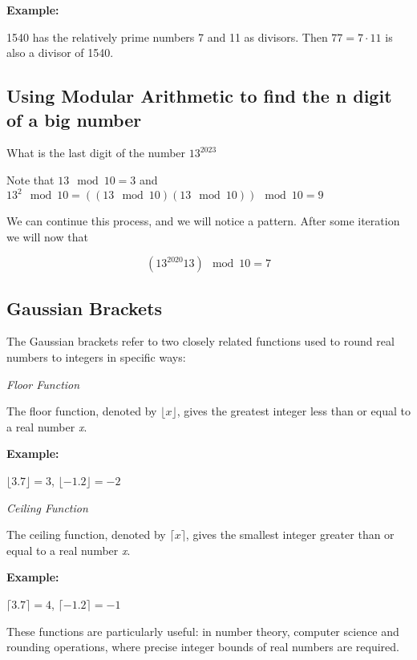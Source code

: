 \textbf{Example:}
\vspace{\baselineskip}

1540 has the relatively prime numbers 7 and 11 as divisors. Then \( 77 = 7 \cdot 11 \) is also a divisor 
of 1540.

\subsection{Using Modular Arithmetic to find the n digit of a big number}

What is the last digit of the number \(13^{2023}\)

Note that \(13 \mod 10 = 3\) and  \(13^2 \mod 10 =  ((13 \mod 10)  (13\mod 10)) \mod 10 = 9 \)

We can continue this process, and we will notice a pattern. After some iteration we will now that

\[(13^{2020} 13) \mod 10 = 7\]

\subsection{Gaussian Brackets}

The Gaussian brackets refer to two closely related functions used to round real numbers to integers 
in specific ways:

\emph{Floor Function}
\vspace{\baselineskip}

The floor function, denoted by \(\lfloor x \rfloor\), gives the greatest integer less than or equal 
to a real number \emph{x}. \\
\vspace{\baselineskip}
    
\textbf{Example:}
\vspace{\baselineskip}
 
\(\lfloor 3.7 \rfloor = 3\), \(\lfloor -1.2 \rfloor = -2\)

\emph{Ceiling Function} 
    
The ceiling function, denoted by \(\lceil x \rceil\), gives the smallest integer greater than or 
equal to a real number \emph{x}. \\
\vspace{\baselineskip}

\textbf{Example:}
\vspace{\baselineskip}
 
\(\lceil 3.7 \rceil = 4\), \(\lceil -1.2 \rceil = -1\)
\vspace{\baselineskip}

These functions are particularly useful: in number theory, computer science 
and rounding operations, where precise integer bounds of real numbers are required.

